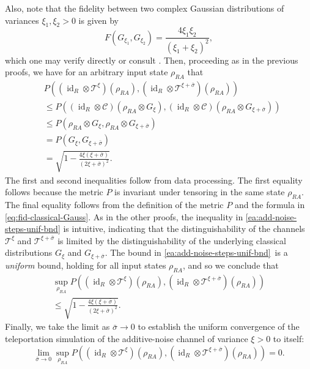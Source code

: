 \documentclass[apsrev,twocolumn]{revtex4-1}%
\begin{document}
Also, note that the fidelity between two complex Gaussian distributions of
variances $\xi_{1},\xi_{2}>0$ is given by%
\begin{equation}
F(G_{\xi_{1}},G_{\xi_{2}})=\frac{4\xi_{1}\xi_{2}}{\left(  \xi_{1}+\xi
_{2}\right)  ^{2}}, \label{eq:fid-classical-Gauss}%
\end{equation}
which one may verify directly or consult \cite{CA79}. Then, proceeding as in
the previous proofs, we have for an arbitrary input state $\rho_{RA}$ that%
\begin{align}
&  P((\operatorname{id}_{R}\otimes\mathcal{T}^{\xi})(\rho_{RA}%
),(\operatorname{id}_{R}\otimes\mathcal{T}^{\xi+\bar{\sigma}})(\rho
_{RA}))\nonumber\\
&  \leq P((\operatorname{id}_{R}\otimes\mathcal{C})(\rho_{RA}\otimes G_{\xi
}),(\operatorname{id}_{R}\otimes\mathcal{C})(\rho_{RA}\otimes G_{\xi
+\bar{\sigma}}))\nonumber\\
&  \leq P(\rho_{RA}\otimes G_{\xi},\rho_{RA}\otimes G_{\xi+\bar{\sigma}%
})\nonumber\\
&  =P(G_{\xi},G_{\xi+\bar{\sigma}})\nonumber\\
&  =\sqrt{1-\frac{4\xi(\xi+\bar{\sigma})}{(2\xi+\bar{\sigma})^{2}}}.
\label{ea:add-noise-steps-unif-bnd}%
\end{align}
The first and second inequalities follow from data processing. The first
equality follows because the metric $P$ is invariant under tensoring in the
same state $\rho_{RA}$. The final equality follows from the definition of the
metric $P$ and the formula in \eqref{eq:fid-classical-Gauss}. As in the other
proofs, the inequality in \eqref{ea:add-noise-steps-unif-bnd} is intuitive,
indicating that the distinguishability of the channels $\mathcal{T}^{\xi}$ and
$\mathcal{T}^{\xi+\bar{\sigma}}$ is limited by the distinguishability of the
underlying classical distributions $G_{\xi}$ and $G_{\xi+\bar{\sigma}}$. The
bound in \eqref{ea:add-noise-steps-unif-bnd}\ is a \textit{uniform} bound,
holding for all input states $\rho_{RA}$, and so we conclude that%
\begin{multline}
\sup_{\rho_{RA}}P((\operatorname{id}_{R}\otimes\mathcal{T}^{\xi})(\rho
_{RA}),(\operatorname{id}_{R}\otimes\mathcal{T}^{\xi+\bar{\sigma}})(\rho
_{RA}))\\
\leq\sqrt{1-\frac{4\xi(\xi+\bar{\sigma})}{(2\xi+\bar{\sigma})^{2}}}.
\label{eq:add-noise-unif-upp-bnd}%
\end{multline}
Finally, we take the limit as $\bar{\sigma}\rightarrow0$ to establish the
uniform convergence of the teleportation simulation of the additive-noise
channel of variance $\xi>0$ to itself:%
\begin{equation}
\lim_{\bar{\sigma}\rightarrow0}\sup_{\rho_{RA}}P((\operatorname{id}_{R}%
\otimes\mathcal{T}^{\xi})(\rho_{RA}),(\operatorname{id}_{R}\otimes
\mathcal{T}^{\xi+\bar{\sigma}})(\rho_{RA}))=0.
\end{equation}
\end{document}
